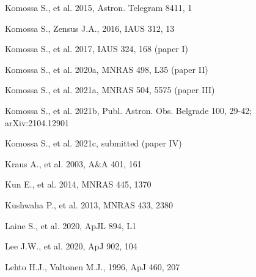 \documentclass[preprints,article,accept,moreauthors,pdftex]{Definitions/mdpi}
\begin{document}
\begin{thebibliography}{999}
Komossa S., et al. 2015, Astron. Telegram 8411, 1

Komossa S., Zensus J.A., 2016, IAUS 312, 13

Komossa S., et al. 2017, IAUS 324, 168 (paper I)


 Komossa S., et al. 2020a, MNRAS 498, L35 (paper II) 




Komossa S., et al. 2021a, MNRAS 504, 5575 (paper III) 

Komossa S., et al. 2021b, Publ. Astron. Obs. Belgrade 100, 29-42; arXiv:2104.12901

Komossa S., et al. 2021c, submitted (paper IV) 


Kraus A., et al. 2003, A\&A 401, 161

Kun E., et al. 2014, MNRAS 445, 1370

Kushwaha P., et al. 2013, MNRAS 433, 2380

Laine S., et al. 2020, ApJL 894, L1 

Lee J.W., et al. 2020, ApJ 902, 104

Lehto H.J., Valtonen M.J., 1996, ApJ 460, 207


\end{thebibliography}
\end{document}
